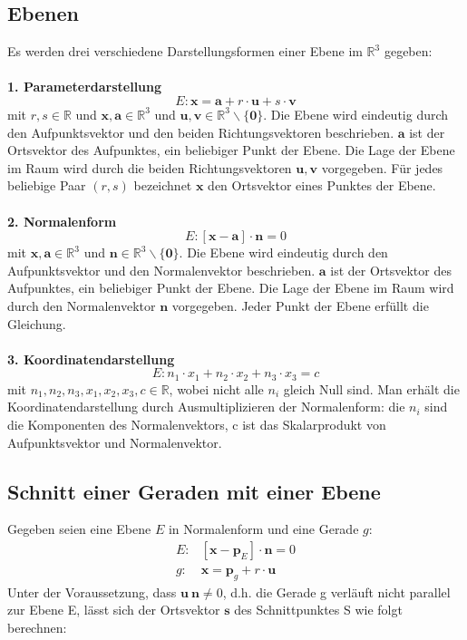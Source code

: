 \subsection{Ebenen}
Es werden drei verschiedene Darstellungsformen einer Ebene im $\mathbb{R}^3$ gegeben:\\
\\
\textbf{1. Parameterdarstellung}
$$
E : \bm{x} = \bm{a} + r\cdot\bm{u} + s\cdot\bm{v}
$$
mit $r, s \in \mathbb{R}$ und $\bm{x}, \bm{a} \in \mathbb{R}^3$ und $\bm{u}, \bm{v} \in \mathbb{R}^3\backslash\{\bm{0}\}$. Die Ebene wird eindeutig durch den Aufpunktsvektor und den beiden Richtungsvektoren beschrieben. $\bm{a}$ ist der Ortsvektor des Aufpunktes, ein beliebiger Punkt der Ebene. Die Lage der Ebene im Raum wird durch die beiden Richtungsvektoren $\bm{u}, \bm{v}$ vorgegeben. Für jedes beliebige Paar $(r, s)$ bezeichnet $\bm{x}$ den Ortsvektor eines Punktes der Ebene.\\
\\
\textbf{2. Normalenform}
$$
E : [\bm{x} - \bm{a}]\cdot\bm{n} = 0
$$
mit $\bm{x}, \bm{a} \in \mathbb{R}^3$ und $\bm{n} \in \mathbb{R}^3\backslash\{\bm{0}\}$. Die Ebene wird eindeutig durch den Aufpunktsvektor und den Normalenvektor beschrieben. $\bm{a}$ ist der Ortsvektor des Aufpunktes, ein beliebiger Punkt der Ebene. Die Lage der Ebene im Raum wird durch den Normalenvektor $\bm{n}$ vorgegeben. Jeder Punkt der Ebene erfüllt die Gleichung.\\
\\
\textbf{3. Koordinatendarstellung}
$$
E : n_1\cdot x_1 + n_2\cdot x_2 + n_3\cdot x_3 = c
$$
mit $n_1, n_2, n_3, x_1, x_2, x_3, c \in \mathbb{R}$, wobei nicht alle $n_i$ gleich Null sind. Man erhält die Koordinatendarstellung durch Ausmultiplizieren der Normalenform: die $n_i$ sind die Komponenten des Normalenvektors, c ist das Skalarprodukt von Aufpunktsvektor und Normalenvektor.\\

\subsection{Schnitt einer Geraden mit einer Ebene}
Gegeben seien eine Ebene $E$ in Normalenform und eine Gerade $g$:
\begin{eqnarray}
E : & [\bm{x} - \bm{p}_E]\cdot\bm{n} = 0 \nonumber\\
g : & \bm{x} = \bm{p}_g + r\cdot\bm{u}\nonumber
\end{eqnarray}
Unter der Voraussetzung, dass $\bm{u}\ \bm{n} \neq 0$, d.h. die Gerade g verläuft nicht parallel zur Ebene E, lässt sich der Ortsvektor $\bm{s}$ des Schnittpunktes S wie folgt berechnen:

